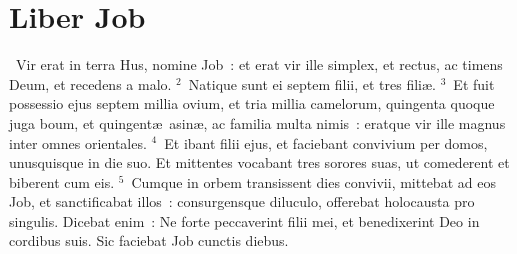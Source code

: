 {\centering \section*{Liber Job}}\thispagestyle{empty}

~\lettrine[lines=10,image=true,loversize=0.05,lraise=-0.03]{V}{}ir erat in terra Hus, nomine Job~: et erat vir ille simplex, et rectus, ac timens Deum, et recedens a malo.
${}^{2}$~Natique sunt ei septem filii, et tres fili\ae .
${}^{3}$~Et fuit possessio ejus septem millia ovium, et tria millia camelorum, quingenta quoque juga boum, et quingent\ae\ asin\ae , ac familia multa nimis~: eratque vir ille magnus inter omnes orientales.
${}^{4}$~Et ibant filii ejus, et faciebant convivium per domos, unusquisque in die suo. Et mittentes vocabant tres sorores suas, ut comederent et biberent cum eis.
${}^{5}$~Cumque in orbem transissent dies convivii, mittebat ad eos Job, et sanctificabat illos~: consurgensque diluculo, offerebat holocausta pro singulis. Dicebat enim~: Ne forte peccaverint filii mei, et benedixerint Deo in cordibus suis. Sic faciebat Job cunctis diebus.


